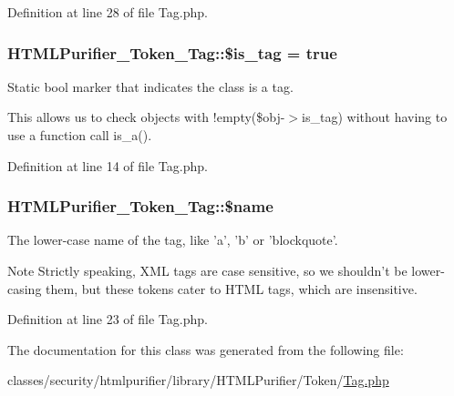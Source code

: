 Definition at line 28 of file Tag.\+php.

\hypertarget{classHTMLPurifier__Token__Tag_a974e4c3fdf940a938335c3aaba2e15b5}{
\subsubsection[{\$is\+\_\+tag}]{\setlength{\rightskip}{0pt plus 5cm}H\+T\+M\+L\+Purifier\+\_\+\+Token\+\_\+\+Tag\+::\$is\+\_\+tag = true}}\label{classHTMLPurifier__Token__Tag_a974e4c3fdf940a938335c3aaba2e15b5}
Static bool marker that indicates the class is a tag.

This allows us to check objects with {\ttfamily !empty(\$obj-\/$>$is\+\_\+tag)} without having to use a function call {\ttfamily is\+\_\+a()}. 

Definition at line 14 of file Tag.\+php.

\hypertarget{classHTMLPurifier__Token__Tag_a11b476f2bf296541387212e5add8b88f}{
\subsubsection[{\$name}]{\setlength{\rightskip}{0pt plus 5cm}H\+T\+M\+L\+Purifier\+\_\+\+Token\+\_\+\+Tag\+::\$name}}\label{classHTMLPurifier__Token__Tag_a11b476f2bf296541387212e5add8b88f}
The lower-\/case name of the tag, like 'a', 'b' or 'blockquote'.

\begin{DoxyNote}{Note}
Strictly speaking, X\+M\+L tags are case sensitive, so we shouldn't be lower-\/casing them, but these tokens cater to H\+T\+M\+L tags, which are insensitive. 
\end{DoxyNote}


Definition at line 23 of file Tag.\+php.



The documentation for this class was generated from the following file\+:\begin{DoxyCompactItemize}
\item 
classes/security/htmlpurifier/library/\+H\+T\+M\+L\+Purifier/\+Token/\hyperlink{Tag_8php}{Tag.\+php}\end{DoxyCompactItemize}
